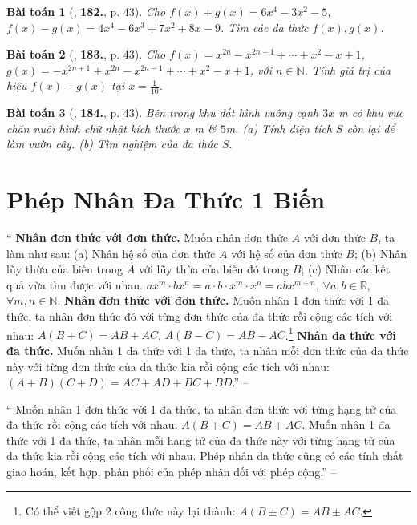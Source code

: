 \documentclass{article}
\numberwithin{equation}{section}
\newtheorem{baitoan}{Bài toán}
\begin{document}
\begin{baitoan}[\cite{Tuyen_Toan_7}, \textbf{182.}, p. 43]
	Cho $f(x) + g(x) = 6x^4 - 3x^2 - 5$, $f(x) - g(x) = 4x^4 - 6x^3 + 7x^2 + 8x - 9$. Tìm các đa thức $f(x),g(x)$.
\end{baitoan}

\begin{baitoan}[\cite{Tuyen_Toan_7}, \textbf{183.}, p. 43]
	Cho $f(x) = x^{2n} - x^{2n-1} + \cdots + x^2 - x + 1$, $g(x) = -x^{2n+1} + x^{2n} - x^{2n-1} + \cdots + x^2 - x + 1$, với $n\in\mathbb{N}$. Tính giá trị của hiệu $f(x) - g(x)$ tại $x = \frac{1}{10}$.
\end{baitoan}

\begin{baitoan}[\cite{Tuyen_Toan_7}, \textbf{184.}, p. 43]
	Bên trong khu đất hình vuông cạnh $3x$ \emph{m} có khu vực chăn nuôi hình chữ nhật kích thước $x$ \emph{m} \& $5$\emph{m}. (a) Tính diện tích $S$ còn lại để làm vườn cây. (b) Tìm nghiệm của đa thức $S$.
\end{baitoan}


\section{Phép Nhân Đa Thức 1 Biến}
`` \textbf{Nhân đơn thức với đơn thức.} Muốn nhân đơn thức $A$ với đơn thức $B$, ta làm như sau: (a) Nhân hệ số của đơn thức $A$ với hệ số của đơn thức $B$; (b) Nhân lũy thừa của biến trong $A$ với lũy thừa của biến đó trong $B$; (c) Nhân các kết quả vừa tìm được với nhau. $ax^m\cdot bx^n = a\cdot b\cdot x^m\cdot x^n = abx^{m+n}$, $\forall a,b\in\mathbb{R}$, $\forall m,n\in\mathbb{N}$.  \textbf{Nhân đơn thức với đơn thức.} Muốn nhân 1 đơn thức với 1 đa thức, ta nhân đơn thức đó với từng đơn thức của đa thức rồi cộng các tích với nhau: $A(B + C) = AB + AC$, $A(B - C) = AB - AC$.\footnote{Có thể viết gộp 2 công thức này lại thành: $A(B\pm C) = AB\pm AC$.}  \textbf{Nhân đa thức với đa thức.} Muốn nhân 1 đa thức với 1 đa thức, ta nhân mỗi đơn thức của đa thức này với từng đơn thức của đa thức kia rồi cộng các tích với nhau: $(A + B)(C + D) = AC + AD + BC + BD$.'' -- \cite[Chap. VI, \S4, pp. 47--48]{SBT_Toan_7_Canh_Dieu_tap_2}

`` Muốn nhân 1 đơn thức với 1 đa thức, ta nhân đơn thức với từng hạng tử của đa thức rồi cộng các tích với nhau. $A(B + C) = AB + AC$.  Muốn nhân 1 đa thức với 1 đa thức, ta nhân mỗi hạng tử của đa thức này với từng hạng tử của đa thức kia rồi cộng các tích với nhau.  Phép nhân đa thức cũng có các tính chất giao hoán, kết hợp, phân phối của phép nhân đối với phép cộng.'' -- \cite[Chap. III, \S4, p. 43]{Tuyen_Toan_7}
\end{document}
